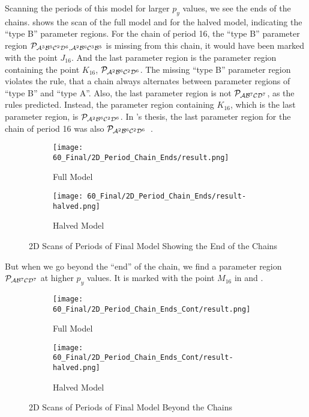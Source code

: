 Scanning the periods of this model for larger $p_y$ values, we see the ends of the chains.
 shows the scan of the full model and  for the halved model, indicating the ``type B'' parameter regions.
For the chain of period 16, the ``type B'' parameter region $\mathcal{P}_{\mathcal{A}^3\mathcal{B}^5\mathcal{C}^2\mathcal{D}^6, \mathcal{A}^2\mathcal{B}^6\mathcal{C}^3\mathcal{B}^5}$ is missing from this chain, it would have been marked with the point $J_{16}$.
And the last parameter region is the parameter region containing the point $K_{16}$, $\mathcal{P}_{\mathcal{A}^2\mathcal{B}^6\mathcal{C}^2\mathcal{D}^6}$.
The missing ``type B'' parameter region violates the rule, that a chain always alternates between parameter regions of ``type B'' and ``type A''.
Also, the last parameter region is not $\mathcal{P}_{\mathcal{A}\mathcal{B}^7\mathcal{C}\mathcal{D}^7}$, as the rules predicted.
Instead, the parameter region containing $K_{16}$, which is the last parameter region, is $\mathcal{P}_{\mathcal{A}^2\mathcal{B}^6\mathcal{C}^2\mathcal{D}^6}$.
In 's thesis, the last parameter region for the chain of period 16 was also $\mathcal{P}_{\mathcal{A}^2\mathcal{B}^6\mathcal{C}^2\mathcal{D}^6}$~\Cite{akyuz2022}.

\begin{figure}
    \centering
    \begin{subfigure}{0.4\textwidth}
        \centering
        \texttt{[image: 60\_Final/2D\_Period\_Chain\_Ends/result.png]}
        \caption{Full Model}
        \label{fig:final.period.end.full}
    \end{subfigure}
    \begin{subfigure}{0.4\textwidth}
        \centering
        \texttt{[image: 60\_Final/2D\_Period\_Chain\_Ends/result-halved.png]}
        \caption{Halved Model}
        \label{fig:final.period.end.halved}
    \end{subfigure}
    \caption{2D Scans of Periods of Final Model Showing the End of the Chains}
\end{figure}

But when we go beyond the ``end'' of the chain, we find a parameter region $\mathcal{P}_{\mathcal{A}\mathcal{B}^7\mathcal{C}\mathcal{D}^7}$ at higher $p_y$ values.
It is marked with the point $M_{16}$ in  and .

\begin{figure}
    \centering
    \begin{subfigure}{0.4\textwidth}
        \centering
        \texttt{[image: 60\_Final/2D\_Period\_Chain\_Ends\_Cont/result.png]}
        \caption{Full Model}
        \label{fig:final.period.beyond.full}
    \end{subfigure}
    \begin{subfigure}{0.4\textwidth}
        \centering
        \texttt{[image: 60\_Final/2D\_Period\_Chain\_Ends\_Cont/result-halved.png]}
        \caption{Halved Model}
        \label{fig:final.period.beyond.halved}
    \end{subfigure}
    \caption{2D Scans of Periods of Final Model Beyond the Chains}
\end{figure}
